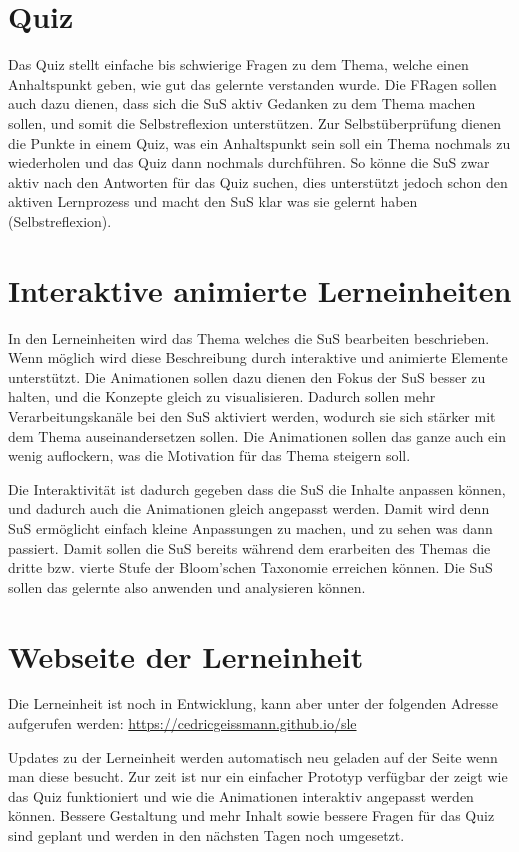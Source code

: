 \documentclass{article}
\begin{document}
\section*{Quiz}

Das Quiz stellt einfache bis schwierige Fragen zu dem Thema, welche einen Anhaltspunkt geben, wie gut das gelernte verstanden wurde. Die FRagen sollen auch dazu dienen, dass sich die SuS aktiv Gedanken zu dem Thema machen sollen, und somit die Selbstreflexion unterstützen. Zur Selbstüberprüfung dienen die Punkte in einem Quiz, was ein Anhaltspunkt sein soll ein Thema nochmals zu wiederholen und das Quiz dann nochmals durchführen. So könne die SuS zwar aktiv nach den Antworten für das Quiz suchen, dies unterstützt jedoch schon den aktiven Lernprozess und macht den SuS klar was sie gelernt haben (Selbstreflexion).

\section*{Interaktive animierte Lerneinheiten}

In den Lerneinheiten wird das Thema welches die SuS bearbeiten beschrieben. Wenn möglich wird diese Beschreibung durch interaktive und animierte Elemente unterstützt. Die Animationen sollen dazu dienen den Fokus der SuS besser zu halten, und die Konzepte gleich zu visualisieren. Dadurch sollen mehr Verarbeitungskanäle bei den SuS aktiviert werden, wodurch sie sich stärker mit dem Thema auseinandersetzen sollen. Die Animationen sollen das ganze auch ein wenig auflockern, was die Motivation für das Thema steigern soll.

Die Interaktivität ist dadurch gegeben dass die SuS die Inhalte anpassen können, und dadurch auch die Animationen gleich angepasst werden. Damit wird denn SuS ermöglicht einfach kleine Anpassungen zu machen, und zu sehen was dann passiert. Damit sollen die SuS bereits während dem erarbeiten des Themas die dritte bzw. vierte Stufe der Bloom'schen Taxonomie erreichen können. Die SuS sollen das gelernte also anwenden und analysieren können.

\section*{Webseite der Lerneinheit}

Die Lerneinheit ist noch in Entwicklung, kann aber unter der folgenden Adresse aufgerufen werden: \url{https://cedricgeissmann.github.io/sle}

Updates zu der Lerneinheit werden automatisch neu geladen auf der Seite wenn man diese besucht. Zur zeit ist nur ein einfacher Prototyp verfügbar der zeigt wie das Quiz funktioniert und wie die Animationen interaktiv angepasst werden können. Bessere Gestaltung und mehr Inhalt sowie bessere Fragen für das Quiz sind geplant und werden in den nächsten Tagen noch umgesetzt.
\end{document}
